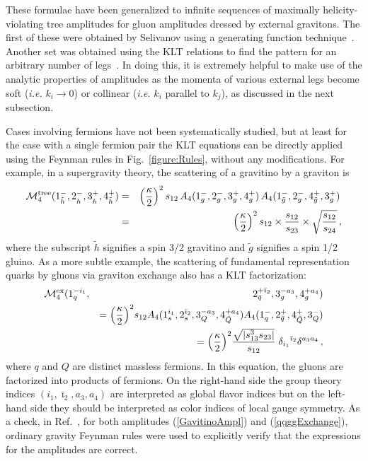 These formulae have been generalized to infinite sequences of
maximally helicity-violating tree amplitudes for gluon amplitudes
dressed by external gravitons.  The first of these were obtained by
Selivanov using a generating function technique~\cite{Selivanov}.
Another set was obtained using the KLT relations to find the pattern
for an arbitrary number of legs~\cite{Square}.  In doing this, it is
extremely helpful to make use of the analytic properties of amplitudes
as the momenta of various external legs become soft ({\it i.e.} $k_i
\rightarrow 0$) or collinear ({\it i.e.}  $k_i$ parallel to $k_j$), as discussed
in the next subsection.

Cases involving fermions have not been systematically studied, but at
least for the case with a single fermion pair the KLT equations
can be directly applied using the Feynman rules in
Fig.~\ref{figure:Rules}, without any modifications.  For example, in a
supergravity theory, the scattering of a gravitino by a graviton is
%
\begin{eqnarray}
{\cal M}_4^{\rm tree} (1^-_{\tilde h}, 2^-_{h {\vphantom{\tilde h}}}, 
                   3^+_{h {\vphantom{\tilde h}}}, 4^+_{\tilde h}) 
& = & \left({\kappa \over 2} \right)^{2}  
s_{12} \, A_4(1_g^-,2_g^-,3_g^+,4_g^+) \, 
A_4(1_{\tilde g}^-,2_g^-,4_{\tilde g}^+,3_g^+) \,  \nonumber \\
& = &
\left({\kappa \over 2} \right)^{2} 
s_{12} \times {s_{12}\over s_{23}}  \times \sqrt{s_{12} \over s_{24}}  \,,
\label{GavitinoAmpl}
\end{eqnarray}
%
where the subscript $\tilde h$ signifies a spin 3/2 gravitino and
$\tilde g$ signifies a spin 1/2 gluino.  As a more subtle example,
the scattering of fundamental representation quarks by gluons via
graviton exchange also has a KLT factorization:
%
\begin{eqnarray}
{\cal M}_4^{\rm ex}(1_q^{-i_1},&& 
 2_{\bar q}^{+{\bar\imath}_2}, 3_g^{-a_3}, 4_g^{+a_4}) 
\nonumber\\
&&  = 
\Bigl({\kappa \over 2}\Bigr)^2
  s_{12} A_4(1_s^{i_1}, 2_s^{{\bar\imath}_2}, 3_Q^{-a_3}, 4_{\bar Q}^{+a_4}) 
         A_4(1_q^-, 2_{\bar q}^+, 4_{\bar Q}^+, 3_Q^-) \nonumber \\
&& = 
\Bigl({\kappa \over 2}\Bigr)^2  {\sqrt{|s_{13}^3 s_{23}|} \over s_{12}} \;
 \delta_{i_1}{}^{{\bar\imath}_2}\delta^{a_3a_4} \,,
\label{qqggExchange}
\end{eqnarray}
%
where $q$ and $Q$ are distinct massless fermions. In this equation, the
gluons are factorized into products of fermions. On the
right-hand side the group theory indices $(i_1, \bar\imath_2, a_3,
a_4)$ are interpreted as global flavor indices but on the
left-hand side they should be interpreted as color indices of local
gauge symmetry.  As a check, in Ref.~\cite{Square}, for both
amplitudes (\ref{GavitinoAmpl}) and (\ref{qqggExchange}), ordinary
gravity Feynman rules were used to explicitly verify that the
expressions for the amplitudes are correct.

